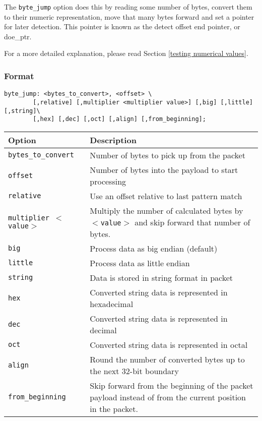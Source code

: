 \documentclass[english]{report}
\begin{document}
The \texttt{byte\_jump} option does this by reading some number of bytes, convert them
to their numeric representation, move that many bytes forward and set a pointer
for later detection.  This pointer is known as the detect offset end pointer, or doe\_ptr.

For a more detailed explanation, please read Section \ref{testing numerical values}.

\subsubsection{Format}

\begin{verbatim}
byte_jump: <bytes_to_convert>, <offset> \
        [,relative] [,multiplier <multiplier value>] [,big] [,little][,string]\
        [,hex] [,dec] [,oct] [,align] [,from_beginning];
\end{verbatim}

\begin{tabular}{| l | p{5in} |}
\hline
{\bf Option} & {\bf Description}\\
\hline
\hline
\texttt{bytes\_to\_convert} & Number of bytes to pick up from the packet\\
\hline
\texttt{offset} & Number of bytes into the payload to start processing\\
\hline
\texttt{relative} & Use an offset relative to last pattern match\\
\hline
\texttt{multiplier $<$value$>$} & Multiply the number of calculated bytes by
\texttt{$<$value$>$} and skip forward that number of bytes.\\
\hline
\texttt{big} & Process data as big endian (default)\\
\hline
\texttt{little} & Process data as little endian\\
\hline
\texttt{string} & Data is stored in string format in packet\\
\hline
\texttt{hex} & Converted string data is represented in hexadecimal\\
\hline
\texttt{dec} & Converted string data is represented in decimal\\
\hline
\texttt{oct} & Converted string data is represented in octal\\
\hline
\texttt{align} & Round the number of converted bytes up to the next 32-bit boundary\\
\hline
\texttt{from\_beginning} & Skip forward from the beginning of the packet payload instead of from the
current position in the packet.\\
\hline
\end{tabular}
\end{document}
